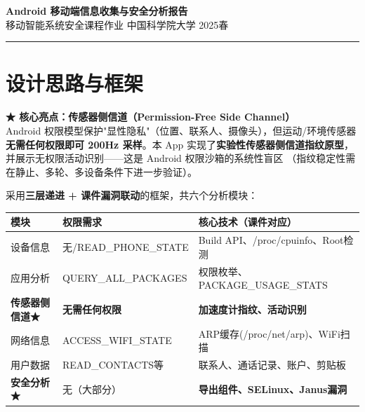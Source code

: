\documentclass[10pt,a4paper]{article}
\begin{document}
\begin{center}
  {\large\bfseries Android 移动端信息收集与安全分析报告} \\[2pt]
  {\small 移动智能系统安全课程作业 \quad 中国科学院大学 \quad 2025春}
\end{center}
\vspace{-3pt}\hrule\vspace{3pt}

\section{设计思路与框架}

\begin{mdframed}[backgroundcolor=lightblue,linecolor=novel,linewidth=1pt,
  innertopmargin=3pt,innerbottommargin=3pt,innerleftmargin=6pt]
\textbf{\color{novel}★ 核心亮点：传感器侧信道（Permission-Free Side Channel）}\\
Android 权限模型保护"显性隐私"（位置、联系人、摄像头），但运动/环境传感器
\textbf{无需任何权限即可 200Hz 采样}。本 App 实现了\textbf{实验性传感器侧信道指纹原型}，
并展示无权限活动识别——这是 Android 权限沙箱的系统性盲区
（指纹稳定性需在静止、多轮、多设备条件下进一步验证）。
\end{mdframed}

\vspace{1pt}
采用\textbf{三层递进 + 课件漏洞联动}的框架，共六个分析模块：

\begin{center}
\begin{tabular}{lll}
\toprule
模块 & 权限需求 & 核心技术（课件对应） \\
\midrule
设备信息 & 无/READ\_PHONE\_STATE & Build API、/proc/cpuinfo、Root检测 \\
应用分析 & QUERY\_ALL\_PACKAGES & 权限枚举、PACKAGE\_USAGE\_STATS \\
\textbf{传感器侧信道★} & \textbf{无需任何权限} & \textbf{加速度计指纹、活动识别} \\
网络信息 & ACCESS\_WIFI\_STATE & ARP缓存(/proc/net/arp)、WiFi扫描 \\
用户数据 & READ\_CONTACTS等 & 联系人、通话记录、账户、剪贴板 \\
\textbf{安全分析★} & 无（大部分） & \textbf{导出组件、SELinux、Janus漏洞} \\
\bottomrule
\end{tabular}
\end{center}
\end{document}
